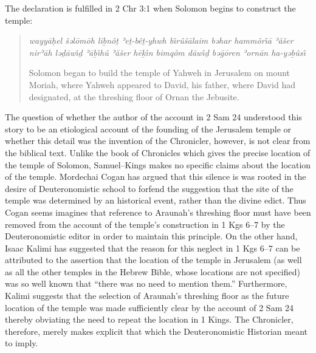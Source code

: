 The declaration is fulfilled in 2 Chr 3:1 when Solomon begins to
construct the temple:

\begin{quote}
\emph{wayyāḥel šəlōmōh liḇnôṯ ʾeṯ-bêṯ-yhwh bı̂rûšālaim bəhar hammôrı̂ā
ʾăšer nirʾāh ləḏāwı̂ḏ ʾāḇı̂hû ʾăšer hēḵı̂n bimqôm dāwı̂ḏ bəḡōren ʾornān
ha-yəḇûsı̂}

Solomon began to build the temple of Yahweh in Jerusalem on mount
Moriah, where Yahweh appeared to David, his father, where David had
designated, at the threshing floor of Ornan the Jebusite.
\end{quote}

The question of whether the author of the account in 2 Sam 24 understood
this story to be an etiological account of the founding of the Jerusalem
temple or whether this detail was the invention of the Chronicler,
however, is not clear from the biblical text. Unlike the book of
Chronicles which gives the precise location of the temple of Solomon,
Samuel--Kings makes no specific claims about the location of the temple.
Mordechai Cogan has argued that this silence is was rooted in the desire
of Deuteronomistic school to forfend the suggestion that the site of the
temple was determined by an historical event, rather than the divine
edict.\autocite[307]{cogan_tarbiz1986} Thus Cogan seems imagines that
reference to Araunah's threshing floor must have been removed from the
account of the temple's construction in 1 Kgs 6--7 by the
Deuteronomistic editor in order to maintain this
principle.\autocite[307]{cogan_tarbiz1986} On the other hand, Isaac
Kalimi has suggested that the reason for this neglect in 1 Kgs 6--7 can
be attributed to the assertion that the location of the temple in
Jerusalem (as well as all the other temples in the Hebrew Bible, whose
locations are not specified) was so well known that ``there was no need
to mention them.''\autocite[I would, however, make the observation that,
depending on how one dates the account in 1 Kng 6--7, it may be the case
that an \emph{exilic} author genuinely did not know the precise location
of the temple. However, Kalimi also points out that other ANE temple
building texts often neglect to specify the precise location of their
subjects. On this point, I would also hasten to add that monumental
inscriptions should be treated separately, since the location of the
inscription, ostensibly, \emph{would be} the location of the
temple.][355--356]{kalimi_htr1990} Furthermore, Kalimi suggests that the
selection of Araunah's threshing floor as the future location of the
temple was made sufficiently clear by the account of 2 Sam 24 thereby
obviating the need to repeat the location in 1
Kings.\autocite[357]{kalimi_htr1990} The Chronicler, therefore, merely
makes explicit that which the Deuteronomistic Historian meant to imply.
